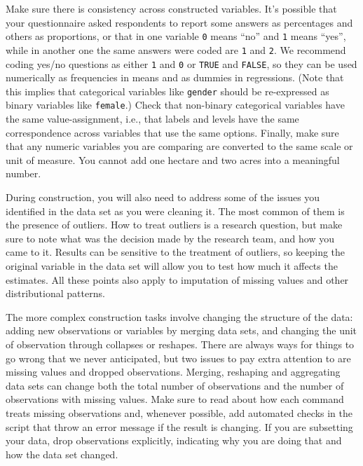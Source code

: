 Make sure there is consistency across constructed variables.
It's possible that your questionnaire asked respondents to report some answers as percentages and others as proportions,
or that in one variable \texttt{0} means ``no'' and \texttt{1} means ``yes'',
while in another one the same answers were coded are \texttt{1} and \texttt{2}.
We recommend coding yes/no questions as either \texttt{1} and \texttt{0} or \texttt{TRUE} and \texttt{FALSE},
so they can be used numerically as frequencies in means and as dummies in regressions.
(Note that this implies that categorical variables like \texttt{gender}
should be re-expressed as binary variables like \texttt{female}.)
Check that non-binary categorical variables have the same value-assignment, i.e.,
that labels and levels have the same correspondence across variables that use the same options.
Finally, make sure that any numeric variables you are comparing are converted to the same scale or unit of measure.
You cannot add one hectare and two acres into a meaningful number.

During construction, you will also need to address some of the issues
you identified in the data set as you were cleaning it.
The most common of them is the presence of outliers.
How to treat outliers is a research question,
but make sure to note what was the decision made by the research team,
and how you came to it.
Results can be sensitive to the treatment of outliers,
so keeping the original variable in the data set will allow you to test how much it affects the estimates.
All these points also apply to imputation of missing values and other distributional patterns.

The more complex construction tasks involve changing the structure of the data:
adding new observations or variables by merging data sets,
and changing the unit of observation through collapses or reshapes.
There are always ways for things to go wrong that we never anticipated,
but two issues to pay extra attention to are missing values and dropped observations.
Merging, reshaping and aggregating data sets can change both the total number of observations
and the number of observations with missing values.
Make sure to read about how each command treats missing observations and,
whenever possible, add automated checks in the script that throw an error message if the result is changing.
If you are subsetting your data,
drop observations explicitly,
indicating why you are doing that and how the data set changed.

